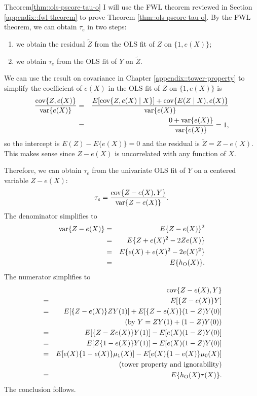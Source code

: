 \begin{myproof}{Theorem}{\ref{thm::ols-pscore-tau-o}}
I will use the FWL theorem reviewed in Section \ref{appendix::fwl-theorem} to prove Theorem \ref{thm::ols-pscore-tau-o}. By the FWL theorem, we can obtain $\tau_e$ in two steps:
\begin{enumerate}
\item
we obtain the residual $\tilde{Z}$ from the OLS fit of $Z$ on $\{1, e(X)\}$;
\item
we obtain $\tau_e$ from the OLS fit of $Y$ on $\tilde{Z}$. 
\end{enumerate}


We can use the result on covariance in Chapter \ref{appendix::tower-property} to simplify the coefficient of $e(X)$ in the OLS fit of $Z$ on $\{1, e(X)\}$ is
\begin{eqnarray*}
\frac{ \textup{cov}\{Z, e(X)  \}  }{  \textup{var}\{ e(X) \} }
&=&  \frac{  E [ \textup{cov}\{Z, e(X)  \mid X\}  ] + \textup{cov}\{  E(Z\mid X), e(X) \}   }{  \textup{var}\{ e(X) \}  } \\
&=& \frac{0 +\textup{var}\{ e(X) \}  }{ \textup{var}\{ e(X) \} } = 1,
\end{eqnarray*}
so the intercept is $E(Z) - E\{e(X)\} = 0$ and the residual is $\tilde{Z} = Z - e(X)$. This makes sense since $Z - e(X)$ is uncorrelated with any function of $X$. 

Therefore, we can obtain $\tau_e$ from the univariate OLS fit of $Y$ on a centered variable $Z - e(X)$:
$$
\tau_e = 
\frac{ \textup{cov}\{  Z-e(X) , Y \}  }{  \textup{var}\{ Z - e(X) \} } .
$$
The denominator simplifies to 
\begin{eqnarray*}
\textup{var}\{ Z - e(X) \} &=& E\{ Z - e(X)\}^2 \\
&=& E\{ Z + e(X)^2 - 2Ze(X)\} \\
&=&E\{ e(X) + e(X)^2 - 2e(X)^2 \} \\
&=&E\{ h_\textsc{O}(X) \} .
\end{eqnarray*}
The numerator simplifies to
\begin{eqnarray*}
&&\textup{cov}\{ Z-e(X)  , Y\} \\
&=&  E[ \{ Z-e(X)  \} Y ] \\
&=& E[ \{ Z-e(X)  \} ZY(1) ] + E[ \{ Z-e(X)  \} (1-Z)Y(0) ] \\
&& \quad\quad\quad\quad (\text{by } Y = ZY(1)  + (1-Z)Y(0)) \\
&=& E[ \{ Z- Ze(X)  \} Y(1)]  - E[  e(X)  (1-Z)Y(0) ]  \\
&=&  E[  Z\{ 1- e(X)  \} Y(1) ] - E [ e(X)  (1-Z)Y(0) ] \\
&=& E[  e(X)\{ 1- e(X)  \} \mu_1(X)]  - E[  e(X)  \{ 1- e(X)  \}  \mu_0(X) ]\\
&&   \quad\quad\quad\quad (\text{tower property and ignorability}) \\
&=& E\{ h_\textsc{O}(X) \tau(X) \} .
\end{eqnarray*}
The conclusion follows. 
 \end{myproof}
 
